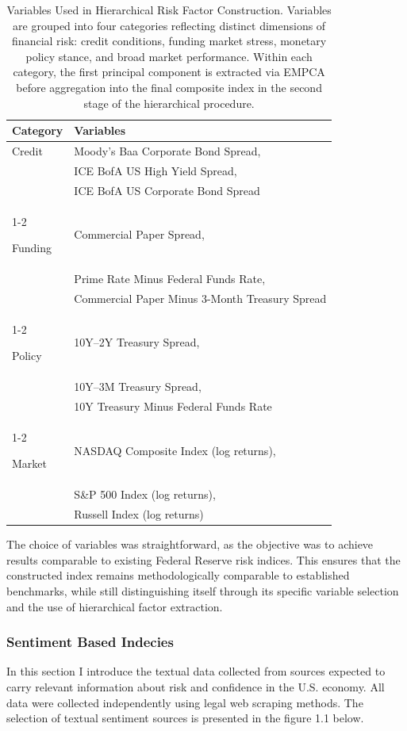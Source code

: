 \documentclass[12pt,a4paper]{report}
\begin{document}
\begin{table}[H]
\centering
\vspace{0.3cm}
\renewcommand{\arraystretch}{1.4}
\begin{tabular}{p{3cm} p{10cm}}
\hline
\textbf{Category} & \textbf{Variables} \\
\hline

Credit 
& Moody's Baa Corporate Bond Spread, \\
& ICE BofA US High Yield Spread, \\
& ICE BofA US Corporate Bond Spread \\
\cline{1-2}

Funding 
& Commercial Paper Spread, \\
& Prime Rate Minus Federal Funds Rate, \\
& Commercial Paper Minus 3-Month Treasury Spread \\
\cline{1-2}

Policy 
& 10Y--2Y Treasury Spread, \\
& 10Y--3M Treasury Spread, \\
& 10Y Treasury Minus Federal Funds Rate \\
\cline{1-2}

Market 
& NASDAQ Composite Index (log returns), \\
& S\&P 500 Index (log returns), \\
& Russell Index (log returns) \\
\hline

\end{tabular}
\caption{Variables Used in Hierarchical Risk Factor Construction. Variables are grouped into four categories reflecting distinct dimensions of financial risk: credit conditions, funding market stress, monetary policy stance, and broad market performance. Within each category, the first principal component is extracted via EMPCA before aggregation into the final composite index in the second stage of the hierarchical procedure.}
\label{tab:hierarchical_risk_variables}
\end{table}

The choice of variables was straightforward, as the objective was to achieve results comparable to existing Federal Reserve risk indices. This ensures that the constructed index remains methodologically comparable to established benchmarks, while still distinguishing itself through its specific variable selection and the use of hierarchical factor extraction.

\subsubsection{Sentiment Based Indecies}
In this section I introduce the textual data collected from sources expected to carry relevant information about risk and confidence in the U.S. economy. All data were collected independently using legal web scraping methods. The selection of textual sentiment sources is presented in the figure 1.1 below.
\end{document}
